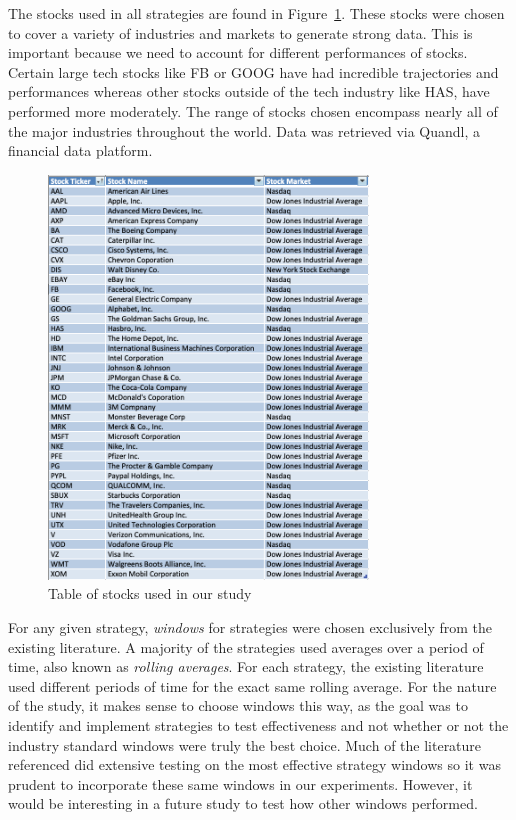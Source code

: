 \documentclass[letterpaper,11pt]{article}
\begin{document}
The stocks used in all strategies are found in Figure~\ref{stocktable}. These stocks were chosen to cover a variety of industries and markets to generate strong data. This is important because we need to account for different performances of stocks. Certain large tech stocks like FB or GOOG have had incredible trajectories and performances whereas other stocks outside of the tech industry like HAS, have performed more moderately. The range of stocks chosen encompass nearly all of the major industries throughout the world. Data was retrieved via Quandl, a financial data platform.

\begin{figure}[h]
\centering
\includegraphics[width=85mm]{stock_table.png}
\caption{Table of stocks used in our study \label{overflow}}
\label{stocktable}
\end{figure}

For any given strategy, {\it windows} for strategies were chosen exclusively from the existing literature. A majority of the strategies used averages over a period of time, also known as {\it rolling averages}. For each strategy, the existing literature used different periods of time for the exact same rolling average. For the nature of the study, it makes sense to choose windows this way, as the goal was to identify and implement strategies to test effectiveness and not whether or not the industry standard windows were truly the best choice. Much of the literature referenced did extensive testing on the most effective strategy windows so it was prudent to incorporate these same windows in our experiments. However, it would be interesting in a future study to test how other windows performed. 
\end{document}
